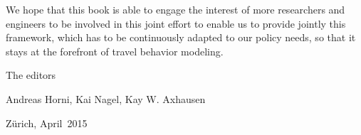 We hope that this book is able to engage the interest of more researchers and engineers to be involved in this joint effort to enable us to provide jointly this \gls{framework}, which has to be continuously adapted to our policy needs, so that it stays at the forefront of travel behavior modeling.

The editors

Andreas Horni, 	Kai Nagel,	Kay W. Axhausen


Zürich, April~2015

%

